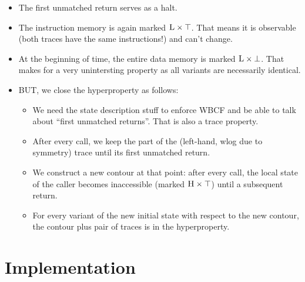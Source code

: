 \documentclass[conference]{IEEEtran}
\begin{document}
\begin{itemize}
\item The first unmatched return serves as a halt.  
\item The instruction memory is again marked $\textsc{L} \times \top$. That
  means it is observable (both traces have the same instructions!) and
  can't change.
\item At the beginning of time, the entire data memory is marked $\textsc{L}
  \times \bot$. That makes for a very unintersting property as all
  variants are necessarily identical.
\item BUT, we close the hyperproperty as follows:
  \begin{itemize}
  \item We need the state description stuff to enforce WBCF and be
    able to talk about ``first unmatched returns''. That is also a
    trace property.
  \item After every call, we keep the part of the (left-hand, wlog
    due to symmetry) trace until its first unmatched return.
  \item We construct a new contour at that point: after every call,
    the local state of the caller becomes inaccessible (marked
    $\textsc{H} \times \top$) until a subsequent return.
  \item For every variant of the new initial state with respect to the
    new contour, the contour plus pair of traces is in the
    hyperproperty.
  \end{itemize}
\end{itemize}


\section{Implementation}
\label{impl}
\end{document}

